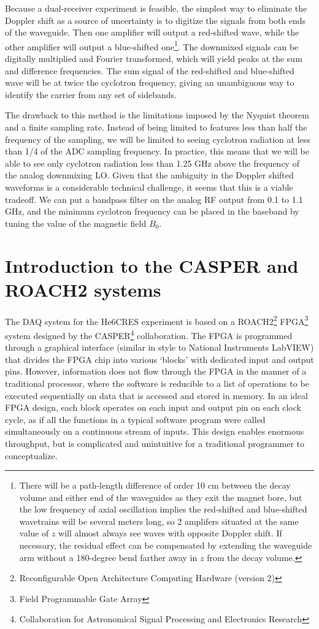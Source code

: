 \documentclass[a4paper,10pt]{article}
\begin{document}
Because a dual-receiver experiment is feasible, the simplest way to eliminate the Doppler shift as a source of uncertainty is to digitize the signals from both ends of the waveguide. Then one amplifier will output a red-shifted wave, while the other amplifier will output a blue-shifted one\footnote{There will be a path-length difference of order 10 cm between the decay volume and either end of the waveguides as they exit the magnet bore, but the low frequency of axial oscillation implies the red-shifted and blue-shifted wavetrains will be several meters long, so 2 amplifers situated at the same value of $z$ will almost always see waves with opposite Doppler shift. If necessary, the residual effect can be compensated by extending the waveguide arm without a 180-degree bend farther away in $z$ from the decay volume.}. The downmixed signals can be digitally multiplied and Fourier transformed, which will yield peaks at the sum and difference frequencies. The sum signal of the red-shifted and blue-shifted wave will be at twice the cyclotron frequency, giving an unambiguous way to identify the carrier from any set of sidebands.

The drawback to this method is the limitations imposed by the Nyquist theorem and a finite sampling rate. Instead of being limited to features less than half the frequency of the sampling, we will be limited to seeing cyclotron radiation at less than 1/4 of the ADC sampling frequency. In practice, this means that we will be able to see only cyclotron radiation less than 1.25 GHz above the frequency of the analog downmixing LO. Given that the ambiguity in the Doppler shifted waveforms is a considerable technical challenge, it seems that this is a viable tradeoff. We can put a bandpass filter on the analog RF output from 0.1 to 1.1 GHz, and the minimum cyclotron frequency can be placed in the baseband by tuning the value of the magnetic field $B_0$.

\section{Introduction to the CASPER and ROACH2 systems}
The DAQ system for the He6CRES experiment is based on a ROACH2\footnote{Reconfigurable Open Architecture Computing Hardware (version 2)} FPGA\footnote{Field Programmable Gate Array} system designed by the CASPER\footnote{Collaboration for Astronomical Signal Processing and Electronics Research} collaboration. The FPGA is programmed through a graphical interface (similar in style to National Instruments LabVIEW) that divides the FPGA chip into various `blocks' with dedicated input and output pins. However, information does not flow through the FPGA in the manner of a traditional processor, where the software is reducible to a list of operations to be executed sequentially on data that is accessed and stored in memory. In an ideal FPGA design, each block operates on each input and output pin on each clock cycle, as if all the functions in a typical software program were called simultaneously on a continuous stream of inputs. This design enables enormous throughput, but is complicated and unintuitive for a traditional programmer to conceptualize. 
\end{document}
